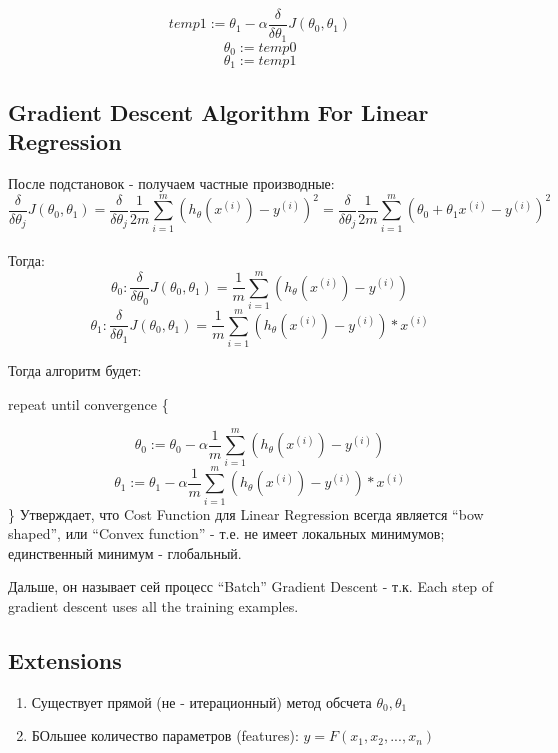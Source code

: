 \documentclass{scrartcl}
\begin{document}
\[temp1 := \theta_1 - \alpha \frac {\delta}{\delta \theta_1}
J(\theta_0,\theta_1)\]
\[\theta_0 := temp0 \]
\[\theta_1 := temp1 \]

\subsection {Gradient Descent Algorithm For Linear Regression }
\label {2-7}
После подстановок - получаем частные производные:
\[ \frac {\delta}{\delta \theta_j} J(\theta_0, \theta_1) = \frac
{\delta}{\delta \theta_j} \frac{1}{2m} \sum\limits_{i=1}^m\left(
  h_\theta (x^{(i)}) - y^{(i)} \right)^2 = \frac {\delta}{\delta
  \theta_j} \frac{1}{2m} \sum\limits_{i=1}^m\left(\theta_0 + \theta_1
  x^{(i)} - y^{(i)} \right)^2
\] \\
Тогда:
\[
\theta_0 : \frac {\delta}{\delta \theta_0} J(\theta_0, \theta_1) =
\frac{1}{m} \sum\limits_{i=1}^m\left(h_\theta (x^{(i)}) - y^{(i)}
\right) \]
\[
\theta_1 : \frac {\delta}{\delta \theta_1} J(\theta_0, \theta_1) =
\frac{1}{m} \sum\limits_{i=1}^m\left(h_\theta (x^{(i)}) - y^{(i)}
\right) * x^{(i)} \]

Тогда алгоритм будет: 


repeat until convergence \{ 


\[\theta_0 := \theta_0 - {\alpha} \frac{1}{m}
\sum\limits_{i=1}^m\left(h_\theta (x^{(i)}) - y^{(i)} \right) \]
\[\theta_1 := \theta_1 - {\alpha} \frac{1}{m}
\sum\limits_{i=1}^m\left(h_\theta (x^{(i)}) - y^{(i)} \right) *
x^{(i)} \] \} Утверждает, что Cost Function для Linear Regression
всегда является ``bow shaped'', или ``Convex function'' - т.е. не
имеет локальных минимумов; единственный минимум - глобальный.

Дальше, он называет сей процесс ``Batch'' Gradient Descent - т.к. Each
step of gradient descent uses all the training examples.

\subsection {Extensions}
\label {2-8}
\begin{enumerate}
\item Существует прямой (не - итерационный) метод обсчета $\theta_0,
  \theta_1$ 
\item БОльшее количество параметров (features): $y = F(x_1, x_2, ...,
x_n)$
\end{enumerate}

\label{Chapter 3}
\end{document}

